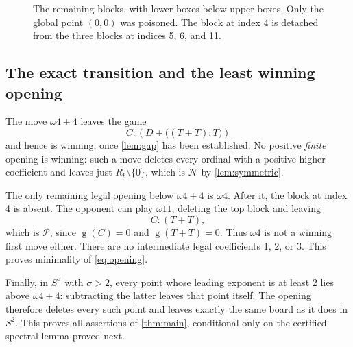 \documentclass[11pt,letterpaper]{article}
\numberwithin{equation}{section}
\theoremstyle{definition}
\theoremstyle{remark}
\newcommand{\sg}{\operatorname{g}}
\newcommand{\Pout}{\mathcal P}
\newcommand{\Nout}{\mathcal N}
\begin{document}
\begin{figure}[htbp]
\centering
{}
\caption{The remaining blocks, with lower boxes below upper boxes.
Only the global point $(0,0)$ was poisoned. The block at index 4
is detached from the three blocks at indices 5, 6, and 11.}
\label{fig:blocks}
\end{figure}

\subsection{The exact transition and the least winning opening}

The move $\omega4+4$ leaves the game
\[
 C:\left(D+\bigl((T+T):T\bigr)\right)
\]
and hence is winning, once \cref{lem:gap} has been established.
No positive \emph{finite} opening is winning: such a move deletes
every ordinal with a positive higher coefficient and leaves just
$R_b\setminus\{0\}$, which is $\Nout$ by \cref{lem:symmetric}.

The only remaining legal opening below $\omega4+4$ is $\omega4$.
After it, the block at index 4 is absent. The opponent can play
$\omega11$, deleting the top block and leaving
\[
 C:(T+T),
\]
which is $\Pout$, since $\sg(C)=0$ and $\sg(T+T)=0$.
Thus $\omega4$ is not a winning first move either.
There are no intermediate legal coefficients 1, 2, or 3.
This proves minimality of \cref{eq:opening}.

Finally, in $S^\sigma$ with $\sigma>2$, every point whose leading
exponent is at least 2 lies above $\omega4+4$: subtracting the latter
leaves that point itself. The opening therefore deletes every such
point and leaves exactly the same board as it does in $S^2$.
This proves all assertions of \cref{thm:main}, conditional only on
the certified spectral lemma proved next.
\end{document}

